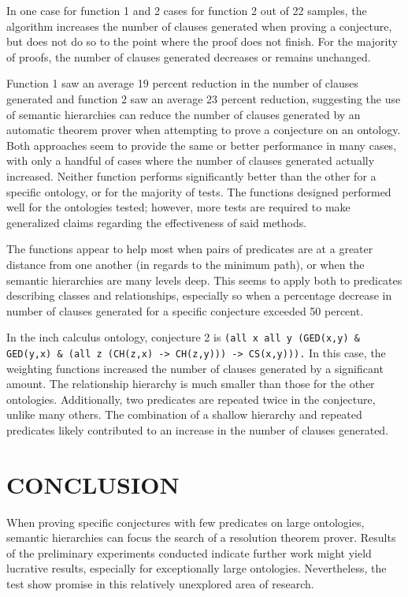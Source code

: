 \documentclass{article}
\begin{document}
In one case for function 1 and 2 cases for function 2 out of 22 samples, the algorithm increases the number of clauses generated when proving a conjecture, but does not do so to the point where the proof does not finish. For the majority of proofs, the number of clauses generated decreases or remains unchanged.

Function 1 saw an average 19 percent reduction in the number of clauses generated and function 2 saw an average 23 percent reduction, suggesting the use of semantic hierarchies can reduce the number of clauses generated by an automatic theorem prover when attempting to prove a conjecture on an ontology. Both approaches seem to provide the same or better performance in many cases, with only a handful of cases where the number of clauses generated actually increased. Neither function performs significantly better than the other for a specific ontology, or for the majority of tests. The functions designed performed well for the ontologies tested; however, more tests are required to make generalized claims regarding the effectiveness of said methods. 

The functions appear to help most when pairs of predicates are at a greater distance from one another (in regards to the minimum path), or when the semantic hierarchies are many levels deep. This seems to apply both to predicates describing classes and relationships, especially so when a percentage decrease in number of clauses generated for a specific conjecture exceeded 50 percent. 

In the inch calculus ontology, conjecture 2 is \texttt{(all x all y (GED(x,y) \& GED(y,x) \& (all z (CH(z,x) -> CH(z,y))) -> CS(x,y))).} In this case, the weighting functions increased the number of clauses generated by a significant amount. The relationship hierarchy is much smaller than those for the other ontologies. Additionally, two predicates are repeated twice in the conjecture, unlike many others. The combination of a shallow hierarchy and repeated predicates likely contributed to an increase in the number of clauses generated. 

\newpage
\vspace*{.05in}
\section{\MakeUppercase{Conclusion}}

When proving specific conjectures with few predicates on large ontologies, semantic hierarchies can focus the search of a resolution theorem prover. Results of the preliminary experiments conducted indicate further work might yield lucrative results, especially for exceptionally large ontologies. Nevertheless, the test show promise in this relatively unexplored area of research.
\end{document}

